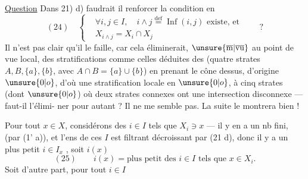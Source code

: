 \uline{Question} Dans 21) d) faudrait il
renforcer la condition en
\[
(24)\quad\left\{\begin{aligned}
&\forall i,j\in I,\quad i\wedge j\overset{\mathrm{def}}{=}\operatorname{Inf}(i,j)\text{ existe, et}\\
&X_{i\wedge j}=X_i\cap X_j
\end{aligned}\right.\qquad ?
\]
Il n'est pas clair qu'il le faille, car
cela éliminerait, $\unsure{\overline{\mathrm{m}}|\overline{\mathrm{vu}}}$ au point de vue local,
des stratifications comme celles déduites des 
(quatre strates $A,B,\{a\},\{b\}$, avec
$A\cap B=\{a\}\cup\{b\}$) en prenant le
cône dessus,  d'origine $\unsure{0|o}$,
d'où une stratification locale en $\unsure{0|o}$, à cinq
strates (dont $\unsure{0|o}$) où deux strates connexes ont
une intersection disconnexe --- faut-il l'élimi-
ner pour autant ? Il  ne me
semble pas. La suite le montrera bien !

Pour tout $x\in X$, considérons  des $i\in I$ tels
que $X_i\ni x$ --- il y en a un nb fini, 
(par (1' a)), et l'ens de ces $I$ est filtrant
décroissant par (21 d), donc il y a
un plus petit $i\in I_x$ , soit $i(x)$
\[
(25)\qquad i(x)=\text{plus petit des }i\in I\text{ tels que }x\in X_i.
\]
Soit d'autre part, pour tout $i\in I$
